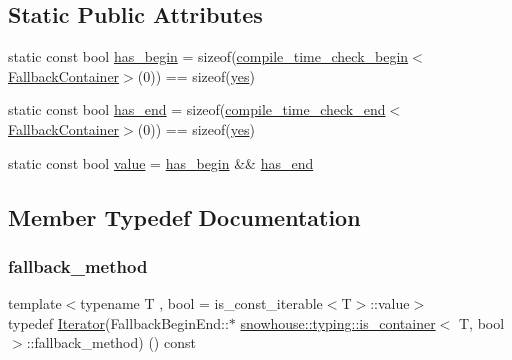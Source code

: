 \subsection*{Static Public Attributes}
\begin{DoxyCompactItemize}
\item 
static const bool \mbox{\hyperlink{structsnowhouse_1_1typing_1_1is__container_a91debdf371b7a26c649f1fba5f5c3e9c}{has\+\_\+begin}} = sizeof(\mbox{\hyperlink{structsnowhouse_1_1typing_1_1is__container_a99f830a0dd21b6c44c1949df6a870529}{compile\+\_\+time\+\_\+check\+\_\+begin}}$<$\mbox{\hyperlink{structsnowhouse_1_1typing_1_1is__container_1_1FallbackContainer}{Fallback\+Container}}$>$(0)) == sizeof(\mbox{\hyperlink{namespacesnowhouse_1_1typing_a4b319cb7567ee3475023c05ed2dadb16}{yes}})
\item 
static const bool \mbox{\hyperlink{structsnowhouse_1_1typing_1_1is__container_a3508fcf59d54260c3287f8cb00db3ee8}{has\+\_\+end}} = sizeof(\mbox{\hyperlink{structsnowhouse_1_1typing_1_1is__container_a32ebf1d5da5ac8a86c2048b2e00816ff}{compile\+\_\+time\+\_\+check\+\_\+end}}$<$\mbox{\hyperlink{structsnowhouse_1_1typing_1_1is__container_1_1FallbackContainer}{Fallback\+Container}}$>$(0)) == sizeof(\mbox{\hyperlink{namespacesnowhouse_1_1typing_a4b319cb7567ee3475023c05ed2dadb16}{yes}})
\item 
static const bool \mbox{\hyperlink{structsnowhouse_1_1typing_1_1is__container_af4b583adec893534a9d15f7887856102}{value}} = \mbox{\hyperlink{structsnowhouse_1_1typing_1_1is__container_a91debdf371b7a26c649f1fba5f5c3e9c}{has\+\_\+begin}} \&\& \mbox{\hyperlink{structsnowhouse_1_1typing_1_1is__container_a3508fcf59d54260c3287f8cb00db3ee8}{has\+\_\+end}}
\end{DoxyCompactItemize}


\subsection{Member Typedef Documentation}
\mbox{\label{structsnowhouse_1_1typing_1_1is__container_a483fd82ca18826d91df5ecf9b0635f19}} 
\subsubsection{\texorpdfstring{fallback\_method}{fallback\_method}}
{\footnotesize\ttfamily template$<$typename T , bool  = is\+\_\+const\+\_\+iterable$<$\+T$>$\+::value$>$ \\
typedef \mbox{\hyperlink{structsnowhouse_1_1typing_1_1is__container_ac43487bbcd55fc7a2e4a2be11d4ae94c}{Iterator}}(Fallback\+Begin\+End\+::$\ast$ \mbox{\hyperlink{structsnowhouse_1_1typing_1_1is__container}{snowhouse\+::typing\+::is\+\_\+container}}$<$ T, bool $>$\+::fallback\+\_\+method) () const}


